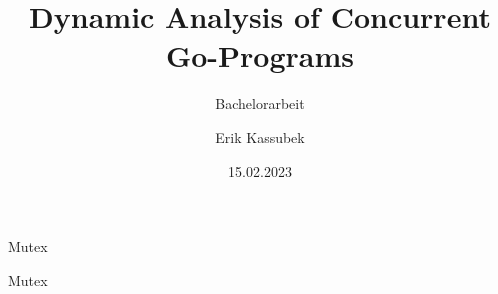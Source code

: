 \documentclass[aspectratio=169]{beamer}  %
\author[Erik Kassubek]{Erik Kassubek}
\title[Dynamic Analysis of Concurrent Go-Programs]{Dynamic Analysis of Concurrent Go-Programs}
\subtitle{Bachelorarbeit}
\institute[]{Institut für Informatik\\Albert-Ludwigs-Universität Freiburg}
\date{15.02.2023}
\begin{document}
\frame{
    \titlepage
}





\begin{frame}{Mutex}
  \begin{minipage}{0.49\textwidth}
    
  \end{minipage}
  \hfill
  \hfill
  \begin{minipage}{0.49\textwidth}
  \end{minipage}
\end{frame}

\begin{frame}{Mutex}
  \begin{minipage}[t]{0.49\textwidth}
    
  \end{minipage}
  \hfill
  \hfill
  \begin{minipage}[t]{0.49\textwidth}
  \end{minipage}
\end{frame}
\end{document}
